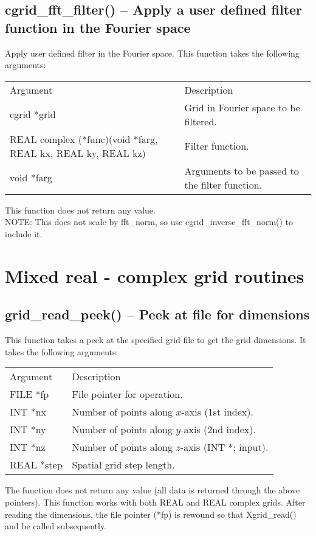 \documentclass[12pt,letterpaper]{report}
\begin{document}
\subsection{cgrid\_fft\_filter() -- Apply a user defined filter function in the Fourier space}

Apply user defined filter in the Fourier space. This function takes the following arguments:
\begin{longtable}{p{} p{}}
Argument & Description\\
\cline{1-2}
cgrid *grid & Grid in Fourier space to be filtered.\\
REAL complex (*func)(void *farg, REAL kx, REAL ky, REAL kz) & Filter function.\\
void *farg & Arguments to be passed to the filter function.\\
\end{longtable}
\noindent
This function does not return any value.\\
NOTE: This does not scale by fft\_norm, so use cgrid\_inverse\_fft\_norm() to include it.

\section{Mixed real - complex grid routines}

\subsection{grid\_read\_peek() -- Peek at file for dimensions}

This function takes a peek at the specified grid file to get the grid dimensions. It takes the following arguments:
\begin{longtable}{p{} p{}}
Argument & Description\\
\cline{1-2}
FILE *fp & File pointer for operation.\\                                                                                   
INT *nx & Number of points along $x$-axis (1st index).\\
INT *ny & Number of points along $y$-axis (2nd index).\\
INT *nz & Number of points along $z$-axis (INT *; input).\\
REAL *step & Spatial grid step length.\\
\end{longtable}
\noindent
The function does not return any value (all data is returned through the above pointers). This function works with both REAL and REAL complex grids. After reading the dimensions, the file pointer (*fp) is rewound so that Xgrid\_read() and be called subsequently.
\end{document}
